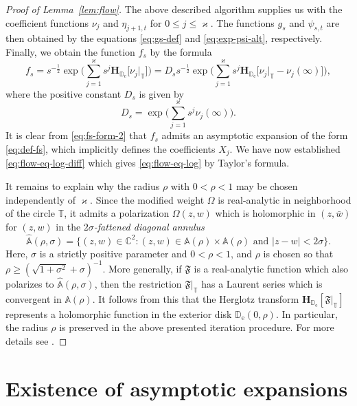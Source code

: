 \documentclass{amsart}
\newcommand{\be}{\begin{equation}}
\newcommand{\ee}{\end{equation}}
\newcommand{\C}{\mathbb{C}}
\newcommand{\D}{\mathbb{D}}
\newcommand{\T}{\mathbb{T}}
\newcommand{\A}{\mathbb{A}}
\newcommand{\Hop}{\mathbf{H}}
\theoremstyle{definition}
\theoremstyle{remark}
\newcommand{\e}{\mathrm{e}}
\numberwithin{equation}{subsection}
\begin{document}
\medskip

\begin{proof}[Proof of Lemma~\ref{lem:flow}]
The above described algorithm supplies us with the 
coefficient functions $\nu_j$ and $\eta_{j+1,t}$ for $0\le j\le \varkappa$.
The functions $g_s$ and $\psi_{s,t}$ are then obtained by the equations
\eqref{eq:gs-def} and \eqref{eq:exp-psi-alt}, 
respectively. Finally, we obtain the function $f_s$ by 
the formula
\be
f_s =s^{-\frac12}\exp\bigg(\sum_{j=1}^{\varkappa}s^j 
\Hop_{\D_\e}\big[\nu_j\vert_{\T}]\bigg)=D_s s^{-\frac12}\exp\bigg(
\sum_{j=1}^{\varkappa}s^j\Hop_{\D_\e}\big[\nu_j\vert_{\T}-\nu_j(\infty)]\bigg),
\label{eq:fs-form-2}
\ee
where the positive constant $D_s$ is given by
\be
D_s=\exp\bigg(\sum_{j=1}^{\varkappa} s^{j}\nu_j(\infty)\bigg).
\ee
It is clear from \eqref{eq:fs-form-2} that $f_s$
admits an asymptotic expansion of the form
\eqref{eq:def-fs}, which implicitly defines the 
coefficients $X_j$. We have now established \eqref{eq:flow-eq-log-diff}
which gives \eqref{eq:flow-eq-log} by Taylor's formula.




It remains to explain why the radius 
$\rho$ with $0<\rho<1$ may be chosen
independently of $\varkappa$. 
Since the modified weight $\Omega$ is real-analytic in neighborhood
of the circle $\T$, it admits a polarization $\Omega(z,w)$
which is holomorphic in $(z,\bar{w})$ for $(z,w)$ 
in the {\em $2\sigma$-fattened diagonal annulus}
\be
\widehat{\A}(\rho,\sigma)=\{(z,w)\in\C^2: (z,w)\in\A(\rho)\times 
\A(\rho)\text{ and }|z-w|< 2\sigma\}.
\ee
Here, $\sigma$ is a strictly positive parameter and $0<\rho<1$, and
$\rho$ is 
chosen so that $\rho\ge (\sqrt{1+\sigma^2}+\sigma)^{-1}$.
More generally, if $\mathfrak{F}$ is a real-analytic function
which also polarizes to $\widehat{\A}(\rho,\sigma)$,
then the restriction $\mathfrak{F}\vert_{\T}$ has a Laurent 
series which is convergent in $\A(\rho)$. It follows from this that
the Herglotz transform $\Hop_{\D_\e}[\mathfrak{F}\vert_\T]$
represents a holomorphic function in the exterior disk $\D_\e(0,\rho)$.
In particular, the radius $\rho$ is preserved in the above
presented iteration procedure.
For more details see
\cite[Subsections~6.1, 6.3 and 6.12]{HW-ONP}.
\end{proof}






\section{Existence of asymptotic expansions}
\end{document}
